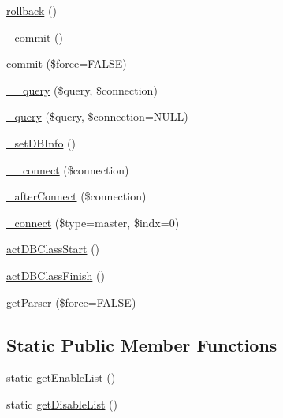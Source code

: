 \begin{DoxyCompactItemize}
\item 
\hyperlink{classDB_a1fb6903379bc241fd318b980b9e30882}{rollback} ()
\item 
\hyperlink{classDB_ae6b44dc80d78b7f73cb6741ff0d63399}{\+\_\+commit} ()
\item 
\hyperlink{classDB_a9e84ef91b522b1cd4d1f0f9a3fe3a57a}{commit} (\$force=F\+A\+L\+SE)
\item 
\hyperlink{classDB_a9e93ad499d34fefc40686d35ed9bf18f}{\+\_\+\+\_\+query} (\$query, \$connection)
\item 
\hyperlink{classDB_a740ea0f536b5ffacabf31b3a7473f5a7}{\+\_\+query} (\$query, \$connection=N\+U\+LL)
\item 
\hyperlink{classDB_a92f2478aeb03b00432332ad4e4a3d700}{\+\_\+set\+D\+B\+Info} ()
\item 
\hyperlink{classDB_a398b5d8142cab5920d3e037b4f22830e}{\+\_\+\+\_\+connect} (\$connection)
\item 
\hyperlink{classDB_ae9511581ab1229970e061e599b0f2f94}{\+\_\+after\+Connect} (\$connection)
\item 
\hyperlink{classDB_a06f0a0c6171674ec183cec2a4051f03f}{\+\_\+connect} (\$type=\textquotesingle{}master\textquotesingle{}, \$indx=0)
\item 
\hyperlink{classDB_a5aa10d0d5f40cbd7c9b20a84b1c1c307}{act\+D\+B\+Class\+Start} ()
\item 
\hyperlink{classDB_abcdbf61ef5e7c96725c7ea2781f165f4}{act\+D\+B\+Class\+Finish} ()
\item 
\hyperlink{classDB_abbcecd47d956cd069e3caa45c600dda4}{get\+Parser} (\$force=F\+A\+L\+SE)
\end{DoxyCompactItemize}
\subsection*{Static Public Member Functions}
\begin{DoxyCompactItemize}
\item 
static \hyperlink{classDB_af0a19b274727d2230af068eec4877664}{get\+Enable\+List} ()
\item 
static \hyperlink{classDB_a4c1e96ac1c1ba247fc147b5bc7d99cbe}{get\+Disable\+List} ()
\end{DoxyCompactItemize}
